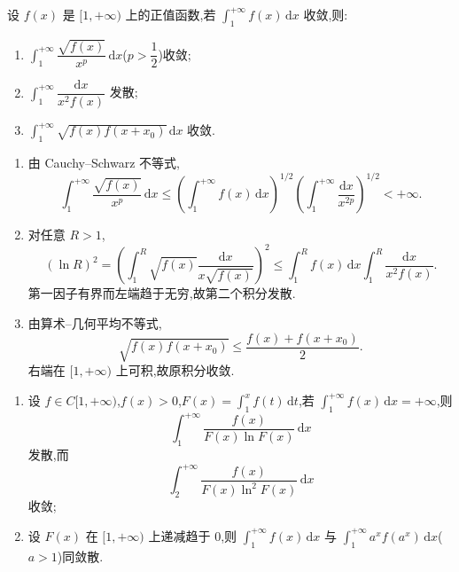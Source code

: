 \begin{example}
  设 $f(x)$ 是 $\lbrack 1,+\infty)$ 上的正值函数,若 $\displaystyle\int_1^{+\infty}f(x)\,\mathrm{d}x$ 收敛,则:
  \begin{enumerate}
    \item $\displaystyle\int_1^{+\infty}\dfrac{\sqrt{f(x)}}{x^p}\,\mathrm{d}x$($p>\dfrac{1}{2}$)收敛;
    \item $\displaystyle\int_1^{+\infty}\dfrac{\mathrm{d}x}{x^2f(x)}$ 发散;
    \item $\displaystyle\int_1^{+\infty}\sqrt{f(x)f(x+x_0)}\,\mathrm{d}x$ 收敛.
  \end{enumerate}
\end{example}
\exampleblank

\begin{solution}
  \begin{enumerate}
    \item 由 Cauchy--Schwarz 不等式,
          \[
            \int_1^{+\infty}\dfrac{\sqrt{f(x)}}{x^p}\,\mathrm{d}x
            \leq\left(\int_1^{+\infty}f(x)\,\mathrm{d}x\right)^{1/2}
            \left(\int_1^{+\infty}\dfrac{\mathrm{d}x}{x^{2p}}\right)^{1/2}<+\infty.
          \]
    \item 对任意 $R>1$,
          \[
            (\ln R)^2
            =\left(\int_1^R\sqrt{f(x)}\dfrac{\mathrm{d}x}{x\sqrt{f(x)}}\right)^2
            \leq\int_1^Rf(x)\,\mathrm{d}x
            \int_1^R\dfrac{\mathrm{d}x}{x^2f(x)}.
          \]
          第一因子有界而左端趋于无穷,故第二个积分发散.
    \item 由算术--几何平均不等式,
          \[
            \sqrt{f(x)f(x+x_0)}\leq\dfrac{f(x)+f(x+x_0)}{2}.
          \]
          右端在 $\lbrack1,+\infty)$ 上可积,故原积分收敛.
  \end{enumerate}
\end{solution}

\begin{example}
  \begin{enumerate}
    \item 设 $f\in C\lbrack 1,+\infty)$,$f(x)>0$,$\displaystyle F(x)=\int_1^xf(t)\,\mathrm{d}t$,若 $\displaystyle\int_1^{+\infty}f(x)\,\mathrm{d}x=+\infty$,则
          \[
            \int_1^{+\infty}\dfrac{f(x)}{F(x)\ln F(x)}\,\mathrm{d}x
          \]
          发散,而
          \[
            \int_2^{+\infty}\dfrac{f(x)}{F(x)\ln^2F(x)}\,\mathrm{d}x
          \]
          收敛;
    \item 设 $F(x)$ 在 $\lbrack 1,+\infty)$ 上递减趋于 $0$,则 $\displaystyle\int_1^{+\infty}f(x)\,\mathrm{d}x$ 与 $\displaystyle\int_1^{+\infty}a^xf(a^x)\,\mathrm{d}x$($a>1$)同敛散.
  \end{enumerate}
\end{example}
\exampleblank


